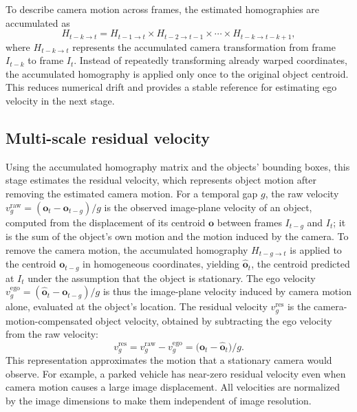 \documentclass{article}
\begin{document}
To describe camera motion across frames, the estimated homographies are accumulated as
\begin{equation}
  H_{t-k \to t} = H_{t-1 \to t} \times H_{t-2 \to t-1} \times \cdots \times H_{t-k \to t-k+1},
  \label{eq:cumulative}
\end{equation}
where $H_{t-k \to t}$ represents the accumulated camera transformation from frame $I_{t-k}$ to frame $I_t$. Instead of repeatedly transforming already warped coordinates, the accumulated homography is applied only once to the original object centroid. This reduces numerical drift and provides a stable reference for estimating ego velocity in the next stage.

\subsection{Multi-scale residual velocity}
\label{sec:residual}
Using the accumulated homography matrix and the objects' bounding boxes, this stage estimates the residual velocity, which represents object motion after removing the estimated camera motion. For a temporal gap $g$, the raw velocity $v^{\mathrm{raw}}_{g} = (\boldsymbol{o}_{t}-\boldsymbol{o}_{t-g})/g$ is the observed image-plane velocity of an object, computed from the displacement of its centroid $\boldsymbol{o}$ between frames $I_{t-g}$ and $I_{t}$; it is the sum of the object's own motion and the motion induced by the camera. To remove the camera motion, the accumulated homography $H_{t-g \to t}$ is applied to the centroid $\boldsymbol{o}_{t-g}$ in homogeneous coordinates, yielding $\hat{\boldsymbol{o}}_{t}$, the centroid predicted at $I_{t}$ under the assumption that the object is stationary. The ego velocity $v^{\mathrm{ego}}_{g} = (\hat{\boldsymbol{o}}_{t}-\boldsymbol{o}_{t-g})/g$ is thus the image-plane velocity induced by camera motion alone, evaluated at the object's location. The residual velocity $v^{\mathrm{res}}_{g}$ is the camera-motion-compensated object velocity, obtained by subtracting the ego velocity from the raw velocity:
\begin{equation}
  v^{\mathrm{res}}_{g} = v^{\mathrm{raw}}_{g} - v^{\mathrm{ego}}_{g} = \bigl(\boldsymbol{o}_{t}-\hat{\boldsymbol{o}}_{t}\bigr)/g.
  \label{eq:residual}
\end{equation}
This representation approximates the motion that a stationary camera would observe. For example, a parked vehicle has near-zero residual velocity even when camera motion causes a large image displacement. All velocities are normalized by the image dimensions to make them independent of image resolution.
\end{document}
